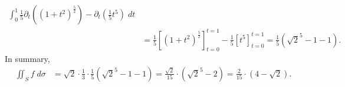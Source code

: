 \documentclass[11pt]{article}
\begin{document}
\begin{solution}
\begin{align*}
        \int_0^1 
        \frac 1 5 \partial_t \left( \left( 1 + t^2 \right)^{\frac 5 2} \right) - \partial_t \left( \frac 1 5 t^{5} \right) 
        \;dt
        \\&
        =
        \frac 1 5
        \left[ \left( 1 + t^2 \right)^{\frac 5 2} \right]_{t=0}^{t=1}
        -
        \frac 1 5
        \left[ t^5 \right]_{t=0}^{t=1}
        =
        \frac 1 5 \left( \sqrt{2}^{5} - 1 - 1 \right)
        .
    \end{align*}
    In summary, 
    \begin{align*}
        \iint_S f \;d\sigma
        &=
        \sqrt{2}
        \cdot 
        \frac 1 3 
        \cdot 
        \frac 1 5 \left( \sqrt{2}^{5} - 1 - 1 \right)
        =
        \frac{\sqrt 2}{15}
        \cdot 
        \left( \sqrt{2}^{5} - 2 \right)
        =
        \frac{2}{15}
        \cdot 
        \left( 4 - \sqrt 2 \right)
        .
    \end{align*}
\end{solution}
\end{document}
